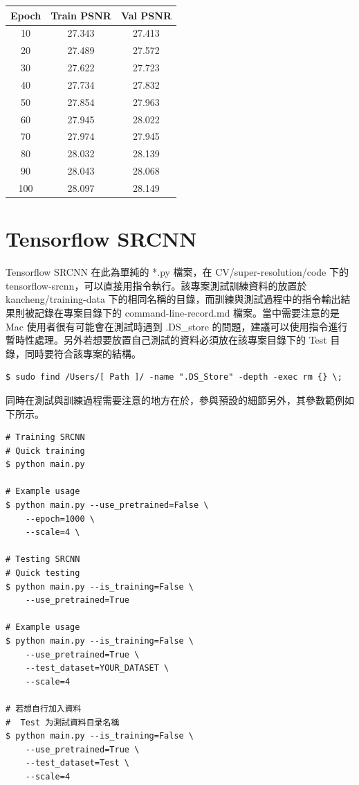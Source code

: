 \documentclass[11pt,UTF8]{ctexart}
\begin{document}
\begin{center}
\begin{tabular}{ccc}
\hline
Epoch & Train PSNR & Val PSNR \\
\hline
10 & 27.343 & 27.413 \\
20 & 27.489 & 27.572 \\
30 & 27.622 & 27.723 \\
40 & 27.734 & 27.832 \\
50 & 27.854 & 27.963 \\
60 & 27.945 & 28.022 \\
70 & 27.974 & 27.945 \\
80 & 28.032 & 28.139 \\
90 & 28.043 & 28.068 \\ 
100 & 28.097 & 28.149 \\
\hline
\end{tabular}
\end{center}
                                                                                                                  

\newpage

\section{Tensorflow SRCNN}

Tensorflow SRCNN 在此為單純的 *.py 檔案，在 CV/super-resolution/code 下的 tensorflow-srcnn，可以直接用指令執行。該專案測試訓練資料的放置於 kancheng/training-data 下的相同名稱的目錄，而訓練與測試過程中的指令輸出結果則被記錄在專案目錄下的 command-line-record.md 檔案。當中需要注意的是 Mac 使用者很有可能會在測試時遇到 .DS\_store 的問題，建議可以使用指令進行暫時性處理。另外若想要放置自己測試的資料必須放在該專案目錄下的 Test 目錄，同時要符合該專案的結構。


\begin{verbatim}
$ sudo find /Users/[ Path ]/ -name ".DS_Store" -depth -exec rm {} \;
\end{verbatim}

同時在測試與訓練過程需要注意的地方在於，參與預設的細節另外，其參數範例如下所示。

\begin{verbatim}
# Training SRCNN
# Quick training
$ python main.py

# Example usage
$ python main.py --use_pretrained=False \
    --epoch=1000 \
    --scale=4 \
    
# Testing SRCNN
# Quick testing
$ python main.py --is_training=False \
    --use_pretrained=True

# Example usage
$ python main.py --is_training=False \
    --use_pretrained=True \
    --test_dataset=YOUR_DATASET \
    --scale=4

# 若想自行加入資料
#  Test 为測試資料目录名稱
$ python main.py --is_training=False \
    --use_pretrained=True \
    --test_dataset=Test \
    --scale=4
\end{verbatim}
\end{document}
